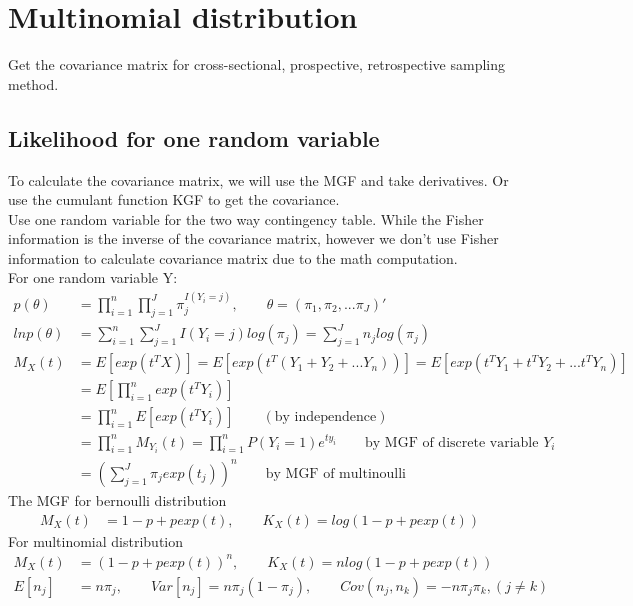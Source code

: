 	\section{Multinomial distribution}
	Get the covariance matrix for cross-sectional, prospective, retrospective sampling method.\\
	
	\subsection{Likelihood for one random variable}
	To calculate the covariance matrix, we will use the MGF and take derivatives. Or use the cumulant function KGF to get the covariance.\\
	Use one random variable for the two way contingency table. While the Fisher information is the inverse of the covariance matrix, however we don't use Fisher information to calculate covariance matrix due to the math computation.\\
	For one random variable Y:
	\begin{align*}
		p(\theta) &= \prod_{i=1}^n \prod_{j=1}^J \pi_{j}^{I(Y_{i} = j)}, \qquad \theta = (\pi_1, \pi_2, ... \pi_J)'\\
		ln p(\theta) &= \sum_{i=1}^n \sum_{j=1}^J I(Y_{i}=j)log( \pi_{j}) = \sum_{j=1}^J n_j log(\pi_{j})\\
		M_X(t) &= E[exp(t^TX)] = E[exp(t^T(Y_1 + Y_2 +... Y_n))] = E[exp(t^TY_1 + t^TY_2 + ... t^TY_n)]\\
		&= E[\prod_{i=1}^n exp(t^TY_i)]\\
		&= \prod_{i=1}^n E[exp(t^TY_i)]  \qquad (\text{by independence})\\
		&= \prod_{i=1}^n M_{Y_i}(t) = \prod_{i=1}^n P(Y_i= 1) e^{ty_i}\qquad  \text{by MGF of discrete variable $Y_i$}\\
		&= \left( \sum_{j=1}^J \pi_j exp(t_j)\right)^n \qquad \text{by MGF of multinoulli}
	\end{align*}
	The MGF for bernoulli distribution
	\begin{align*}
		M_X(t) &= 1-p + p exp(t), \qquad K_X(t) = log (1-p + p exp(t))
	\end{align*}
	For multinomial distribution
	\begin{align*}
		M_X(t) &= (1-p + p exp(t))^n, \qquad K_X(t) = n log (1-p + p exp(t))\\
		E[n_j] &= n\pi_j, \qquad Var[n_j] = n\pi_j(1-\pi_j), \qquad Cov(n_j, n_k) = -n\pi_j\pi_k, {(j \neq k)}
	\end{align*}    

